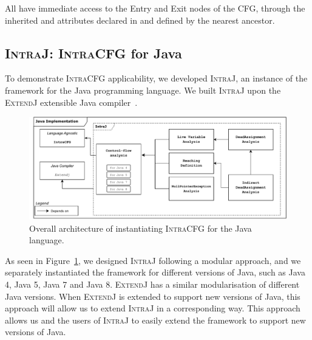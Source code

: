 All  have immediate access to the Entry and Exit nodes of the
CFG, through the inherited  and  attributes declared in  and
defined by the nearest  ancestor.



\subsection{\textsc{IntraJ}: \textsc{IntraCFG} for Java}
\label{sec:IntraJ}
To demonstrate \textsc{IntraCFG} applicability, we developed
\textsc{IntraJ}, an instance of the framework for the Java programming language.
We built \textsc{IntraJ} upon the \textsc{ExtendJ} extensible Java compiler~\cite{DBLP:conf/oopsla/EkmanH07}.
\begin{figure}[H]
    \centering
    \includegraphics[scale=0.52]{kappa/img/architecturejava.pdf}
    \caption{\label{fig:intraJ} Overall architecture of instantiating \textsc{IntraCFG} for the Java language.}
\end{figure}

As seen in Figure~\ref{fig:intraJ}, we designed \textsc{IntraJ}
following a  modular approach, and we separately
instantiated the framework for different versions of Java, such as Java 4,
Java 5, Java 7 and Java 8.
\textsc{ExtendJ} has a similar modularisation of different Java versions.
When \textsc{ExtendJ} is extended to support new versions of Java, this approach
will allow us to extend \textsc{IntraJ} in a corresponding way.
This approach allows us and the users of \textsc{IntraJ}
to easily extend the framework to support new versions of Java.

